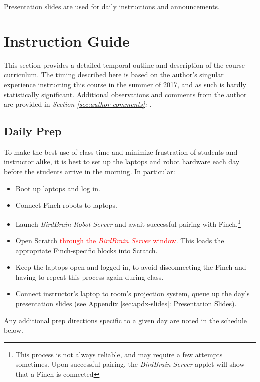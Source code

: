 \documentclass[a4paper]{article}
\begin{document}
		Presentation slides are used for daily instructions and announcements.

	\newpage
	
	\section{Instruction Guide}
	
	This section provides a detailed temporal outline and description of the course curriculum. The timing described here is based on the author's singular experience instructing this course in the summer of 2017, and as such is hardly statistically significant. Additional observations and comments from the author are provided in \emph{Section \ref{sec:author-comments}: }. 
	
	\subsection{Daily Prep}
	
		To make the best use of class time and minimize frustration of students and instructor alike, it is best to set up the laptops and robot hardware each day before the students arrive in the morning. In particular:
		
		\begin{itemize}
			\item Boot up laptops and log in.
			
			\item Connect Finch robots to laptops.
			
			\item Launch \emph{BirdBrain Robot Server} and await successful pairing with Finch.\footnote[1]{This process is not always reliable, and may require a few attempts sometimes. Upon successful pairing, the \emph{BirdBrain Server} applet will show that a Finch is connected}
			
			\item Open Scratch \textcolor{red}{through the \emph{BirdBrain Server} window}. This loads the appropriate Finch-specific blocks into Scratch.
			
			\item Keep the laptops open and logged in, to avoid disconnecting the Finch and having to repeat this process again during class.
			
			\item Connect instructor's laptop to room's projection system, queue up the day's presentation slides (see \hyperref[sec:apdx-slides]{Appendix \ref*{sec:apdx-slides}: Presentation Slides}).
			
		\end{itemize}
		\vspace{1em}
		Any additional prep directions specific to a given day are noted in the schedule below.
	
\end{document}
